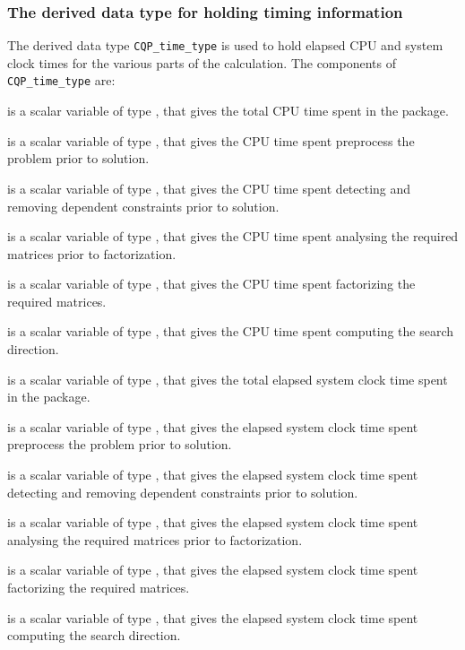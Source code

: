 \documentclass{galahad}
\newcommand{\packagename}{CQP}
\begin{document}
\subsubsection{The derived data type for holding timing
 information}\label{typetime}
The derived data type
{\tt \packagename\_time\_type}
is used to hold elapsed CPU and system clock times for the various parts of
the calculation. The components of
{\tt \packagename\_time\_type}
are:
\begin{description}
 is a scalar variable of type \realdp, that gives
 the total CPU time spent in the package.

 is a scalar variable of type \realdp, that gives
 the CPU time spent preprocess the problem prior to solution.

 is a scalar variable of type \realdp, that gives
 the CPU time spent detecting and removing dependent constraints prior
to solution.

 is a scalar variable of type \realdp, that gives
 the CPU time spent analysing the required matrices prior to factorization.

 is a scalar variable of type \realdp, that gives
 the CPU time spent factorizing the required matrices.

 is a scalar variable of type \realdp, that gives
 the CPU time spent computing the search direction.

 is a scalar variable of type \realdp, that gives
 the total elapsed system clock time spent in the package.

 is a scalar variable of type \realdp, that gives
 the elapsed system clock time spent preprocess the problem prior to solution.

 is a scalar variable of type \realdp,
that gives  the elapsed system clock time spent detecting and removing
dependent constraints prior to solution.

 is a scalar variable of type \realdp, that gives
 the elapsed system clock time spent analysing the required matrices prior to
factorization.

 is a scalar variable of type \realdp, that gives
 the elapsed system clock time spent factorizing the required matrices.

 is a scalar variable of type \realdp, that gives
 the elapsed system clock time spent computing the search direction.

\end{description}
\end{document}
